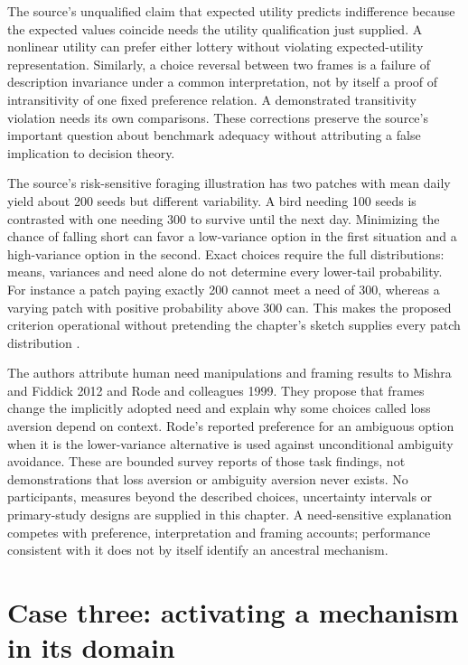 The source's unqualified claim that expected utility predicts
indifference because the expected values coincide needs the utility
qualification just supplied. A nonlinear utility can prefer either
lottery without violating expected-utility representation. Similarly,
a choice reversal between two frames is a failure of description
invariance under a common interpretation, not by itself a proof of
intransitivity of one fixed preference relation. A demonstrated
transitivity violation needs its own comparisons. These corrections
preserve the source's important question about benchmark adequacy
without attributing a false implication to decision theory.

The source's risk-sensitive foraging illustration has two patches with
mean daily yield about 200 seeds but different variability. A bird
needing 100 seeds is contrasted with one needing 300 to survive until
the next day. Minimizing the chance of falling short can favor a
low-variance option in the first situation and a high-variance option
in the second. Exact choices require the full distributions: means,
variances and need alone do not determine every lower-tail probability.
For instance a patch paying exactly 200 cannot meet a need of 300,
whereas a varying patch with positive probability above 300 can.
This makes the proposed criterion operational without pretending the
chapter's sketch supplies every patch distribution
\cite[p.~637]{CosmidesTooby2021Adaptationism}.

The authors attribute human need manipulations and framing results to
Mishra and Fiddick 2012 and Rode and colleagues 1999. They propose that
frames change the implicitly adopted need and explain why some choices
called loss aversion depend on context. Rode's reported preference for
an ambiguous option when it is the lower-variance alternative is used
against unconditional ambiguity avoidance. These are bounded survey
reports of those task findings, not demonstrations that loss aversion
or ambiguity aversion never exists. No participants, measures beyond
the described choices, uncertainty intervals or primary-study designs
are supplied in this chapter. A need-sensitive explanation competes
with preference, interpretation and framing accounts; performance
consistent with it does not by itself identify an ancestral mechanism.

\section{Case three: activating a mechanism in its domain}
\label{sec:p11-rat106-activation}

